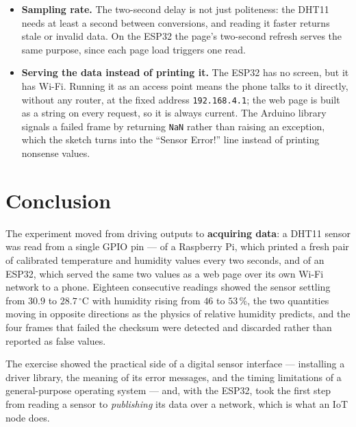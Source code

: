 \documentclass[10pt,a4paper]{article}
\begin{document}
\begin{itemize}
        the GPIO pin was only ever an output, here the same pin is driven by the Pi for
        the start signal and then switched to an input to listen to the sensor. Two
        pull-ups end up in parallel on the line --- the module's $10\,\mathrm{k}\Omega$
        and the Pi's $1.8\,\mathrm{k}\Omega$ on GPIO2 --- giving about
        $1.5\,\mathrm{k}\Omega$, which the DHT11 can still pull LOW. On a pin without a
        board pull-up (say GPIO4) only the module's resistor would be present.
  \item \textbf{Sampling rate.} The two-second delay is not just politeness: the
        DHT11 needs at least a second between conversions, and reading it faster
        returns stale or invalid data. On the ESP32 the page's two-second refresh
        serves the same purpose, since each page load triggers one read.
  \item \textbf{Serving the data instead of printing it.} The ESP32 has no screen,
        but it has Wi-Fi. Running it as an access point means the phone talks to it
        directly, without any router, at the fixed address \texttt{192.168.4.1}; the web
        page is built as a string on every request, so it is always current. The Arduino
        library signals a failed frame by returning \texttt{NaN} rather than raising an
        exception, which the sketch turns into the ``Sensor Error!'' line instead of
        printing nonsense values.
\end{itemize}

\section{Conclusion}

The experiment moved from driving outputs to \textbf{acquiring data}: a DHT11 sensor
was read from a single GPIO pin --- of a Raspberry Pi, which printed a fresh pair of
calibrated temperature and humidity values every two seconds, and of an ESP32, which
served the same two values as a web page over its own Wi-Fi network to a phone. Eighteen consecutive readings showed the sensor
settling from $30.9$ to $28.7\,^{\circ}\mathrm{C}$ with humidity rising from $46$ to
$53\,\%$, the two quantities moving in opposite directions as the physics of relative
humidity predicts, and the four frames that failed the checksum were detected and
discarded rather than reported as false values.

The exercise showed the practical side of a digital sensor interface --- installing a
driver library, the meaning of its error messages, and the timing limitations of a
general-purpose operating system --- and, with the ESP32, took the first step from
reading a sensor to \emph{publishing} its data over a network, which is what an IoT
node does.
\end{document}
